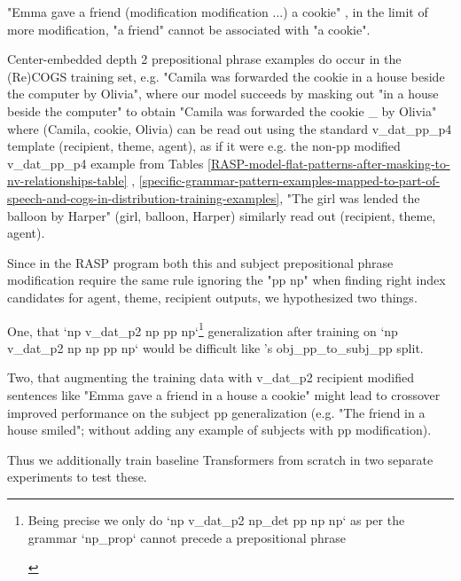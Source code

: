 \documentclass[11pt]{article}
\begin{document}
{\begin{footnotesize}
"Emma gave a friend (modification modification ...) a cookie" , in the limit of more modification, "a friend" cannot be associated with "a cookie".

Center-embedded depth 2 prepositional phrase examples do occur in the (Re)COGS training set, e.g. "Camila was forwarded the cookie in a house beside the computer by Olivia", where our model succeeds by masking out "in a house beside the computer" to obtain "Camila was forwarded the cookie \_ by Olivia" where (Camila, cookie, Olivia) can be read out using the standard v\_dat\_pp\_p4 template (recipient, theme, agent), as if it were e.g. the non-pp modified v\_dat\_pp\_p4 example from Tables \ref{RASP-model-flat-patterns-after-masking-to-nv-relationships-table} , \ref{specific-grammar-pattern-examples-mapped-to-part-of-speech-and-cogs-in-distribution-training-examples}, "The girl was lended the balloon by Harper" (girl, balloon, Harper) similarly read out (recipient, theme, agent).
\end{footnotesize}}

Since in the RASP program both this and subject prepositional phrase modification require the same rule ignoring the "pp np" when finding right index candidates for agent, theme, recipient outputs, we hypothesized two things.

One, that `np v\_dat\_p2 np pp np`\footnote{\begin{footnotesize}Being precise we only do `np v\_dat\_p2 np\_det pp np np` as per the grammar `np\_prop` cannot precede a prepositional phrase\end{footnotesize}} generalization after training on `np v\_dat\_p2 np np pp np` would be difficult like \citep{Wu2023}'s obj\_pp\_to\_subj\_pp split.

Two, that augmenting the training data with v\_dat\_p2 recipient modified sentences like "Emma gave a friend in a house a cookie" might lead to crossover improved performance on the subject pp generalization (e.g. "The friend in a house smiled"; without adding any example of subjects with pp modification).

Thus we additionally train \citep{Wu2023} baseline Transformers from scratch in two separate experiments to test these.
\end{document}

